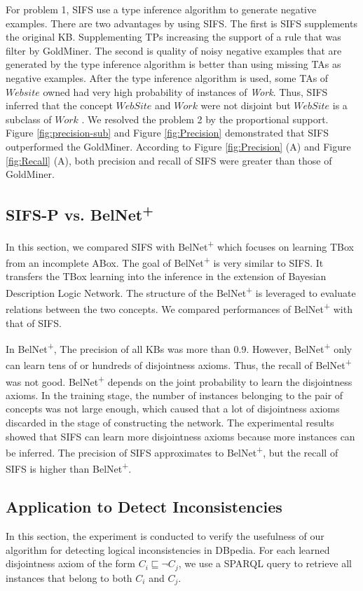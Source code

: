 For problem 1, SIFS use a type inference algorithm to generate negative examples. There are two advantages by using SIFS. The first is SIFS supplements the original KB. Supplementing TPs increasing the support of a rule that was filter by GoldMiner. The second is quality of noisy negative examples that are generated by the type inference algorithm is better than using missing TAs as negative examples. After the type inference algorithm is used, some TAs of $Website$ owned had very high probability of instances of \emph{Work}. Thus, SIFS inferred that the concept $WebSite$ and $Work$ were not disjoint but $WebSite$ is a subclass of $Work$ . We resolved the problem 2 by the proportional support. Figure \ref{fig:precision-sub} and Figure \ref{fig:Precision} demonstrated that SIFS outperformed the GoldMiner. According to Figure \ref{fig:Precision} (A) and Figure \ref{fig:Recall} (A), both precision and recall of SIFS were greater than those of GoldMiner.

\subsection{SIFS-P vs. BelNet\textsuperscript{+}}
In this section, we compared SIFS with BelNet\textsuperscript{+}\cite{BelNet+} which focuses on learning TBox from an incomplete ABox. The goal of BelNet\textsuperscript{+} is very similar to SIFS. It transfers the TBox learning into the inference in the extension of Bayesian Description Logic Network. The structure of the BelNet\textsuperscript{+} is leveraged to evaluate relations between the two concepts. We compared performances of BelNet\textsuperscript{+} with that of SIFS. 

In BelNet\textsuperscript{+}, The precision of all KBs was more than 0.9. However, BelNet\textsuperscript{+} only can learn tens of or hundreds of disjointness axioms. Thus, the recall of BelNet\textsuperscript{+} was not good. BelNet\textsuperscript{+} depends on the joint probability to learn the disjointness axioms. In the training stage, the number of instances belonging to the pair of concepts was not large enough, which caused that a lot of disjointness axioms discarded in the stage of constructing the network. The experimental results showed that SIFS can learn more disjointness axioms because more instances can be inferred. The precision of SIFS approximates to BelNet\textsuperscript{+}, but the recall of SIFS is higher than BelNet\textsuperscript{+}.



\subsection{Application to Detect Inconsistencies}
In this section, the experiment is conducted to verify the usefulness of our algorithm for detecting logical inconsistencies in DBpedia. For each learned disjointness axiom of the form $C_{i}\sqsubseteq \neg C_{j}$, we use a SPARQL query to retrieve all instances that belong to both $C_{i}$ and $C_{j}$.


